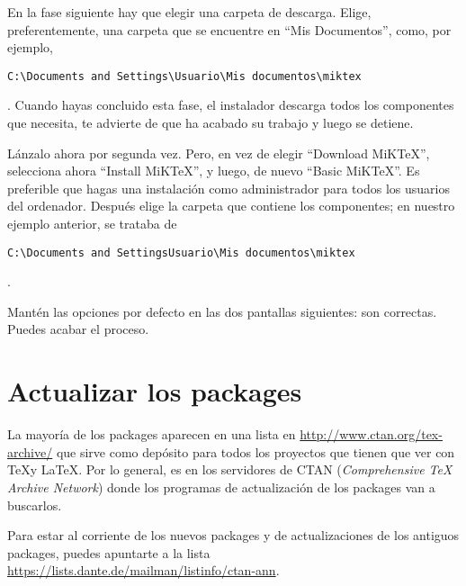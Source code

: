 En la fase siguiente hay que elegir una carpeta de descarga. Elige, preferentemente, una carpeta que se encuentre en \enquote{Mis Documentos}, como, por ejemplo, \begin{english}\verb|C:\Documents and Settings\Usuario\Mis documentos\miktex|\end{english}. Cuando hayas concluido esta fase, el instalador descarga todos los componentes que necesita, te advierte de que ha acabado su trabajo y luego se detiene.

Lánzalo ahora por segunda vez. Pero, en vez de elegir \enquote{Download MiKTeX}, selecciona ahora \enquote{Install MiKTeX}, y luego, de nuevo \enquote{Basic MiKTeX}. 
Es preferible que hagas una instalación como administrador para todos los usuarios del ordenador. Después elige la carpeta que contiene los componentes; en nuestro ejemplo anterior, se trataba de \begin{english}\verb|C:\Documents and SettingsUsuario\Mis documentos\miktex|\end{english}.

Mantén las opciones por defecto en las dos pantallas siguientes: son correctas. Puedes acabar el proceso.

\section{Actualizar los packages}\label{maj}

La mayoría de los packages aparecen en una lista en \url{http://www.ctan.org/tex-archive/} que sirve como depósito para todos los proyectos que tienen que ver con \TeX y \LaTeX. Por lo general, es en los servidores de CTAN (\textenglish{\emph{Comprehensive TeX Archive Network}}) donde los programas de actualización de los packages van a buscarlos.

\begin{plusloins}
	Para estar al corriente de los nuevos packages y de actualizaciones de los antiguos packages, puedes apuntarte a la lista \url{https://lists.dante.de/mailman/listinfo/ctan-ann}. 
\end{plusloins}

